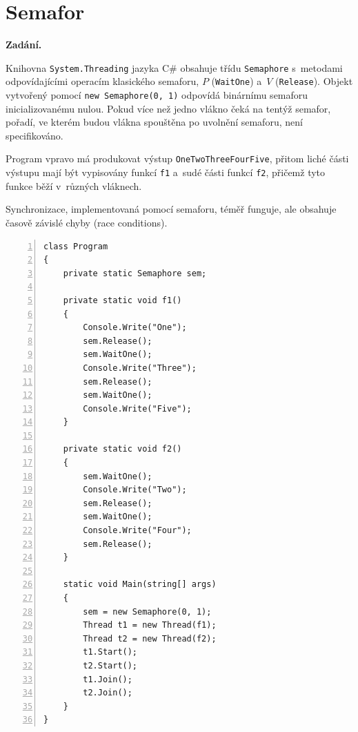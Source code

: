 \section{Semafor}

\noindent\textbf{Zadání.}\par
Knihovna \texttt{System.Threading} jazyka C\# obsahuje třídu \texttt{Semaphore}
s~metodami odpovídajícími operacím klasického semaforu, $P$ (\texttt{WaitOne})
a~$V$ (\texttt{Release}). Objekt vytvořený pomocí \texttt{new Semaphore(0, 1)} odpovídá
binárnímu semaforu inicializovanému nulou. Pokud více než jedno vlákno čeká na tentýž
semafor, pořadí, ve kterém budou vlákna spouštěna po uvolnění semaforu, není specifikováno.

Program vpravo má produkovat výstup \texttt{OneTwoThreeFourFive}, přitom liché části
výstupu mají být vypisovány funkcí \texttt{f1} a~sudé části funkcí \texttt{f2}, přičemž
tyto funkce běží v~různých vláknech.

Synchronizace, implementovaná pomocí semaforu, téměř funguje, ale obsahuje časově závislé
chyby (race conditions).

\begin{lstlisting}[language={[Sharp]C},numbers=left]
class Program
{
    private static Semaphore sem;

    private static void f1()
    {
        Console.Write("One");
        sem.Release();
        sem.WaitOne();
        Console.Write("Three");
        sem.Release();
        sem.WaitOne();
        Console.Write("Five");
    }

    private static void f2()
    {
        sem.WaitOne();
        Console.Write("Two");
        sem.Release();
        sem.WaitOne();
        Console.Write("Four");
        sem.Release();
    }

    static void Main(string[] args)
    {
        sem = new Semaphore(0, 1);
        Thread t1 = new Thread(f1);
        Thread t2 = new Thread(f2);
        t1.Start();
        t2.Start();
        t1.Join();
        t2.Join();
    }
}
\end{lstlisting}

